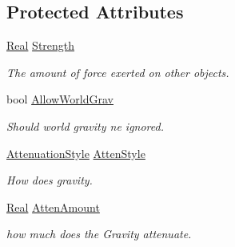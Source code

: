 \subsection*{Protected Attributes}
\begin{DoxyCompactItemize}
\item 
\hypertarget{classphys_1_1GravityWell_acc6e405d39cdc6017040902190e16652}{
\hyperlink{namespacephys_af7eb897198d265b8e868f45240230d5f}{Real} \hyperlink{classphys_1_1GravityWell_acc6e405d39cdc6017040902190e16652}{Strength}}
\label{d6/d21/classphys_1_1GravityWell_acc6e405d39cdc6017040902190e16652}

\begin{DoxyCompactList}\small\item\em The amount of force exerted on other objects. \item\end{DoxyCompactList}\item 
\hypertarget{classphys_1_1GravityWell_a8b7106e7670a7bc074c245269d211ba0}{
bool \hyperlink{classphys_1_1GravityWell_a8b7106e7670a7bc074c245269d211ba0}{AllowWorldGrav}}
\label{d6/d21/classphys_1_1GravityWell_a8b7106e7670a7bc074c245269d211ba0}

\begin{DoxyCompactList}\small\item\em Should world gravity ne ignored. \item\end{DoxyCompactList}\item 
\hypertarget{classphys_1_1GravityWell_a13fda8d3a831a6eba5fd2e03ef2dbcfc}{
\hyperlink{classphys_1_1GravityWell_a72d0da5f140b91bc364f2c46e7536e1f}{AttenuationStyle} \hyperlink{classphys_1_1GravityWell_a13fda8d3a831a6eba5fd2e03ef2dbcfc}{AttenStyle}}
\label{d6/d21/classphys_1_1GravityWell_a13fda8d3a831a6eba5fd2e03ef2dbcfc}

\begin{DoxyCompactList}\small\item\em How does gravity. \item\end{DoxyCompactList}\item 
\hypertarget{classphys_1_1GravityWell_ad9fd8f2f2dea6a53241ef90852e84503}{
\hyperlink{namespacephys_af7eb897198d265b8e868f45240230d5f}{Real} \hyperlink{classphys_1_1GravityWell_ad9fd8f2f2dea6a53241ef90852e84503}{AttenAmount}}
\label{d6/d21/classphys_1_1GravityWell_ad9fd8f2f2dea6a53241ef90852e84503}

\begin{DoxyCompactList}\small\item\em how much does the Gravity attenuate. \item\end{DoxyCompactList}\end{DoxyCompactItemize}


